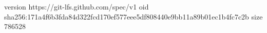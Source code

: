 version https://git-lfs.github.com/spec/v1
oid sha256:171a4f6b3fda84d322fcd170ef577eee5df808440e9bb11a89b01ec1b4fc7c2b
size 786528
